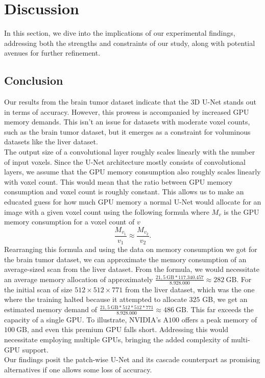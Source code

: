 \chapter{Discussion}
In this section, we dive into the implications of our experimental findings, addressing both the strengths and constraints of our study, along with potential avenues for further refinement.

\section{Conclusion}
Our results from the brain tumor dataset indicate that the $3$D U-Net stands out in terms of accuracy. However, this prowess is accompanied by increased GPU memory demands.
This isn't an issue for datasets with moderate voxel counts, such as the brain tumor dataset, but it emerges as a constraint for voluminous datasets like the liver dataset.\\[1ex]
The output size of a convolutional layer roughly scales linearly with the number of input voxels. Since the U-Net architecture mostly consists of convolutional layers, we assume that the GPU memory consumption also roughly scales linearly with voxel count.
This would mean that the ratio between GPU memory consumption and voxel count is roughly constant.
This allows us to make an educated guess for how much GPU memory a normal U-Net would allocate for an image with a given voxel count using the following formula where $M_v$ is the GPU memory consumption for a voxel count of $v$
$$\frac{M_{v_1}}{v_1}\approx\frac{M_{v_2}}{v_2}.$$
Rearranging this formula and using the data on memory consumption we got for the brain tumor dataset, we can approximate the memory consumption of an average-sized scan from the liver dataset.
From the formula, we would necessitate an average memory allocation of approximately $\frac{21,5~\text{GB} * 117.340.457}{8.928.000}\approx282~\text{GB}$.
For the initial scan of size $512\times512\times771$ from the liver dataset, which was the one where the training halted because it attempted to allocate $325$ GB, we get an estimated memory demand of $\frac{21,5~\text{GB} * 512*512*771}{8.928.000}\approx486~\text{GB}$.
This far exceeds the capacity of a single GPU.
To illustrate, NVIDIA's A$100$ offers a peak memory of $100~\text{GB}$, and even this premium GPU falls short. Addressing this would necessitate employing multiple GPUs,
bringing the added complexity of multi-GPU support.\\[1ex]
Our findings posit the patch-wise U-Net and its cascade counterpart as promising alternatives if one allows some loss of accuracy.
